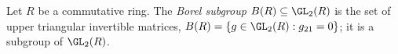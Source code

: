 Let $R$ be a commutative ring. The \emph{Borel subgroup} $B(R)\subseteq\GL_2(R)$ is the set of upper triangular
invertible matrices, $B(R)=\{g\in\GL_2(R):g_{21}=0\}$; it is a subgroup of $\GL_2(R)$.
